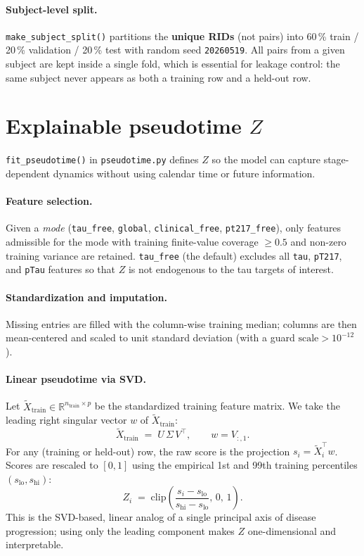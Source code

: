 \documentclass[11pt]{article}
\newcommand{\code}[1]{\texttt{#1}}
\begin{document}
\paragraph{Subject-level split.} \code{make\_subject\_split()} partitions the
\textbf{unique RIDs} (not pairs) into 60\,\% train / 20\,\% validation /
20\,\% test with random seed \code{20260519}. All pairs from a given
subject are kept inside a single fold, which is essential for leakage
control: the same subject never appears as both a training row and a
held-out row.

\section{Explainable pseudotime \texorpdfstring{$Z$}{Z}}
\label{sec:pseudotime}

\code{fit\_pseudotime()} in \code{pseudotime.py} defines $Z$ so the model
can capture stage-dependent dynamics without using calendar time or future
information.

\paragraph{Feature selection.} Given a \emph{mode}
(\code{tau\_free}, \code{global}, \code{clinical\_free}, \code{pt217\_free}),
only features admissible for the mode with training finite-value coverage
$\geq 0.5$ and non-zero training variance are retained. \code{tau\_free}
(the default) excludes all \code{tau}, \code{pT217}, and \code{pTau}
features so that $Z$ is not endogenous to the tau targets of interest.

\paragraph{Standardization and imputation.} Missing entries are filled with
the column-wise training median; columns are then mean-centered and scaled
to unit standard deviation (with a guard $\text{scale} > 10^{-12}$).

\paragraph{Linear pseudotime via SVD.} Let
$\tilde X_{\text{train}} \in \mathbb{R}^{n_{\text{train}} \times p}$ be the
standardized training feature matrix. We take the leading right singular
vector $w$ of $\tilde X_{\text{train}}$:
\begin{equation}
\tilde X_{\text{train}} \;=\; U\,\Sigma\,V^\top, \qquad w = V_{:,1}.
\label{eq:svd}
\end{equation}
For any (training or held-out) row, the raw score is the projection
$s_i = \tilde X_i^\top w$. Scores are rescaled to $[0,1]$ using the
empirical 1st and 99th training percentiles $(s_{\text{lo}}, s_{\text{hi}})$:
\begin{equation}
Z_i \;=\; \mathrm{clip}\!\left(\frac{s_i - s_{\text{lo}}}{s_{\text{hi}} - s_{\text{lo}}},\,0,\,1\right).
\label{eq:zscore}
\end{equation}
This is the SVD-based, linear analog of a single principal axis of disease
progression; using only the leading component makes $Z$ one-dimensional and
interpretable.
\end{document}
